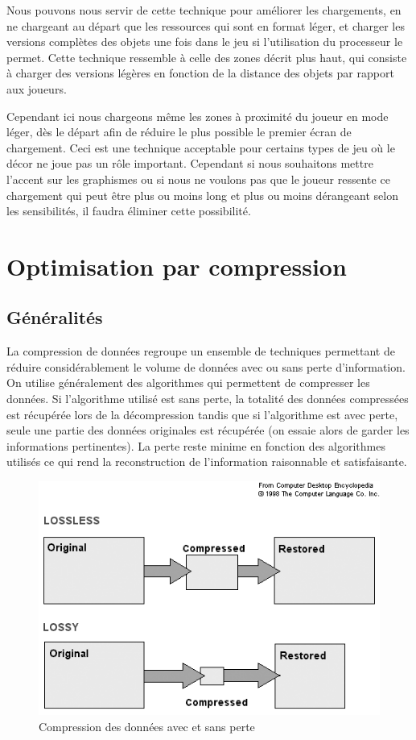 \documentclass[a4paper, 12pt]{article} %
\begin{document}
Nous pouvons nous servir de cette technique pour améliorer les chargements, en ne chargeant au départ que les ressources qui sont en format léger, et charger les versions complètes des objets une fois dans le jeu si l'utilisation du processeur le permet. Cette technique ressemble à celle des zones décrit plus haut, qui consiste à charger des versions légères en fonction de la distance des objets par rapport aux joueurs.

Cependant ici nous chargeons même les zones à proximité du joueur en mode léger, dès le départ afin de réduire le plus possible le premier écran de chargement. Ceci est une technique acceptable pour certains types de jeu où le décor ne joue pas un rôle important. Cependant si nous souhaitons mettre l'accent sur les graphismes ou si nous ne voulons pas que le joueur ressente ce chargement qui peut être plus ou moins long et plus ou moins dérangeant selon les sensibilités, il faudra éliminer cette possibilité.

\newpage
\section{Optimisation par compression}
\subsection{Généralités}
La compression de données regroupe un ensemble de techniques permettant de réduire considérablement le volume de données avec ou sans perte d'information. On utilise généralement des algorithmes qui permettent de compresser les données. Si l'algorithme utilisé est sans perte, la totalité des données compressées est récupérée lors de la décompression tandis que si l'algorithme est avec perte, seule une partie des données originales est récupérée (on essaie alors de garder les informations pertinentes). La perte reste minime en fonction des algorithmes utilisés ce qui rend la reconstruction de l'information raisonnable et satisfaisante. 

\begin{figure}[!h]%
\includegraphics[width=\columnwidth]{images/data_compression.png}%
\caption{Compression des données avec et sans perte}%
\label{}%
\end{figure}
\end{document}

